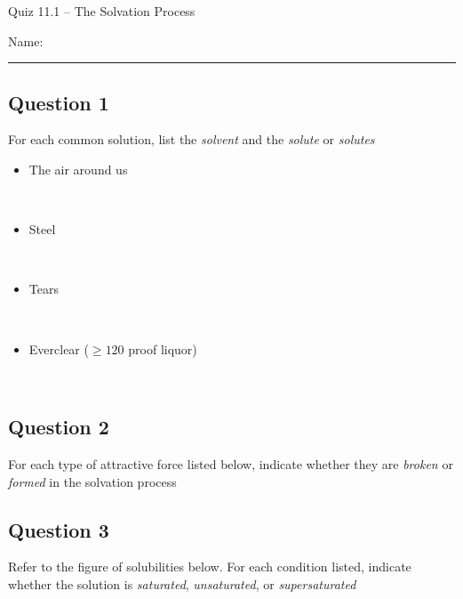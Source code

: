 \documentclass[11pt, letterpaper]{memoir}
\begin{document}
	\begin{center}
		{\large	Quiz 11.1 -- The Solvation Process}
	\end{center}
	{\large Name: \rule[-1mm]{4in}{.1pt} 

	\subsection*{Question 1}
  For each common solution, list the \emph{solvent} and the \emph{solute} or \emph{solutes}
  \begin{itemize}
    \item The air around us

      ~
    \item Steel

      ~
    \item Tears

      ~
    \item Everclear ($\geq120$ proof liquor)

      ~
  \end{itemize}

	\subsection*{Question 2}
  For each type of attractive force listed below, indicate whether they are \emph{broken} or \emph{formed} in the solvation process


  \vspace{2em}
  \subsection*{Question 3}
  Refer to the figure of solubilities below. For each condition listed, indicate whether the solution is \emph{saturated}, \emph{unsaturated}, or \emph{supersaturated}

}
\end{document}
